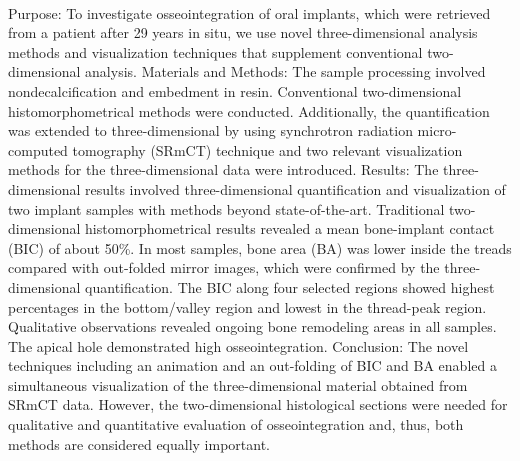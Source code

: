 {{\begin{enumerate}
\\ \aabstract
Purpose: To investigate osseointegration of oral implants, which were retrieved from a patient after 29 years in situ, we use novel three-dimensional analysis methods and visualization techniques that supplement conventional two-dimensional analysis. Materials and Methods: The sample processing involved nondecalcification and embedment in resin. Conventional two-dimensional histomorphometrical methods were conducted. Additionally, the quantification was extended to three-dimensional by using synchrotron radiation micro-computed tomography (SRmCT) technique and two relevant visualization methods for the three-dimensional data were introduced. Results: The three-dimensional results involved three-dimensional quantification and visualization of two implant samples with methods beyond state-of-the-art. Traditional two-dimensional histomorphometrical results revealed a mean bone-implant contact (BIC) of about 50\%. In most samples, bone area (BA) was lower inside the treads compared with out-folded mirror images, which were confirmed by the three-dimensional quantification. The BIC along four selected regions showed highest percentages in the bottom/valley region and lowest in the thread-peak region. Qualitative observations revealed ongoing bone remodeling areas in all samples. The apical hole demonstrated high osseointegration. Conclusion: The novel techniques including an animation and an out-folding of BIC and BA enabled a simultaneous visualization of the three-dimensional material obtained from SRmCT data. However, the two-dimensional histological sections were needed for qualitative and quantitative evaluation of osseointegration and, thus, both methods are considered equally important.
\newpage
\vspace*{-5mm}
\\ \aabstract

\end{enumerate}}}
